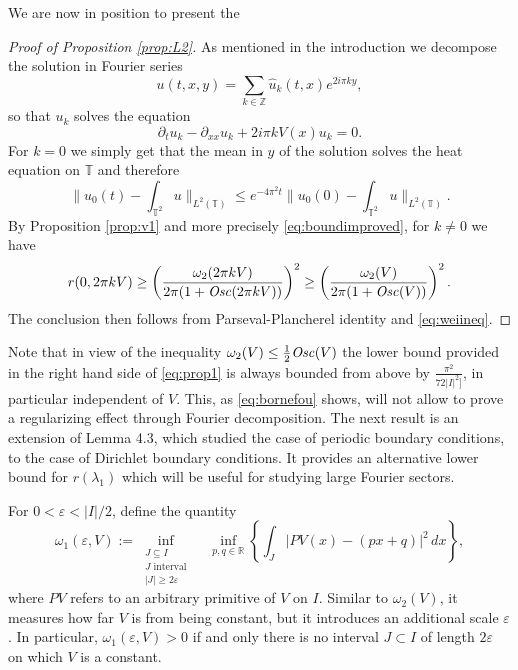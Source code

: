 \documentclass[12pt]{article}
\newcommand{\R}{\mathbb{R}}
\newcommand{\Z}{\mathbb{Z}}
\newcommand{\T}{\mathbb{T}}
\newcommand{\eps}{\varepsilon}
\begin{document}
\medskip
We are now in position to present the
\begin{proof}[Proof of Proposition \ref{prop:L2}]
As mentioned in the introduction we decompose the solution in Fourier series
$$
u(t, x, y) = \sum_{k \in \Z} \hat u_k(t,x) e^{2i\pi ky},
$$
so that $u_k$ solves the equation
$$
\partial_t u_k - \partial_{xx}u_k + 2i\pi kV(x)u_k = 0.
$$
For $k = 0$ we simply get that the mean in $y$ of the solution 
solves the heat equation on $\T$ and therefore
$$
\|u_0(t) - \int_{\T^2}u\|_{L^2(\T)} \leq e^{-4\pi^2t} \|u_0(0) -
\int_{\T^2}u\|_{L^2(\T)}.
$$
By Proposition \ref{prop:v1} and more precisely \eqref{eq:boundimproved}, 
for $k \neq 0$ we have
\begin{equation}\label{eq:bornefou}
r(0, 2\pi kV) \geq  
\left( \frac{\omega_2(2\pi k V)}{2\pi(1 + {\it Osc}(2\pi k V))}\right)^2 \geq
 \left( \frac{\omega_2(V)}{2\pi(1 + {\it Osc}(V))}\right)^2.
\end{equation}
The conclusion then follows from Parseval-Plancherel identity and
\eqref{eq:weiineq}.
\end{proof}

\medskip

Note that in view of the inequality $\omega_2(V) \leq \frac12 {\it Osc}(V)$ the lower 
bound provided in the right hand side of \eqref{eq:prop1} is always bounded from above 
by $\frac{\pi^2}{72|I|^2]}$, in particular independent of $V$. This, as \eqref{eq:bornefou} 
shows, will not allow to prove a regularizing effect through Fourier decomposition. 
The next result is an extension of \cite{Wei21} Lemma 4.3, which studied the case of 
periodic boundary conditions, to the case of Dirichlet boundary conditions. 
It provides an alternative lower bound for $r(\lambda_1)$ which will be useful for 
studying large Fourier sectors.

\smallskip

For $0 < \eps < |I|/2$, define the quantity 
\begin{equation}\label{def:omega1}
\omega_1(\eps, V) := \inf_{\substack{J \subseteq I\\J \text{ interval}\\|J| \geq
2\eps}} \quad \inf_{p, q \in \R} \left\{
	\int_J |PV(x) - (px+q)|^2\, dx \right\},
\end{equation}
where $PV$ refers to an arbitrary primitive of $V$ on $I$.
Similar to $\omega_2(V)$, it measures how far $V$ is from being constant, but it
introduces an additional scale $\eps$. In particular, $\omega_1(\eps, V) > 0$ if and 
only there is no interval $J\subset I$ of length $2\eps$ on which $V$ is 
a constant. 
\end{document}
